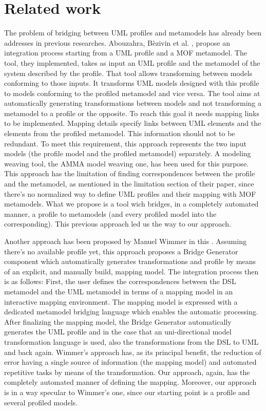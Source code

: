 \section{Related work}\label{sec:related}


The problem of bridging between UML profiles and metamodels has already been addresses in previous researches. Abouzahra, B\`ezivin et al. \cite{Abouzahra}, propose an integration process starting from a UML profile and a MOF metamodel. 
The tool, they implemented, takes as input an UML profile and the metamodel of the system described by the profile. That tool allows
transforming between models conforming to those inputs. It transforms UML models designed with this profile to models conforming to the profiled metamodel and vice versa. The tool aims at automatically generating transformations between models and not transforming a metamodel to a profile or the opposite. To reach this goal it needs mapping links to be implemented. Mapping details specify links between UML elements and the elements from the profiled metamodel. This information should not to be redundant. To meet this requirement, this approach represents the two input models (the profile model and the profiled metamodel) separately. A modeling weaving tool, the AMMA model weaving one, has been used for this purpose. This approach has the limitation of finding correspondences between the profile and the metamodel, as mentioned in the limitation section of their paper, since there's no normalized way to define UML profiles and their mapping with MOF metamodels. What we propose is a tool wich bridges, in a completely automated manner, a profile to metamodels (and every profiled model into the corresponding). This previous approach led us the way to our approach.

Another approach has been proposed by Manuel Wimmer in this \cite{Wimmer}. Assuming there's no available profile yet, this approach proposes a Bridge Generator component which automatically generates transformations and profile by means of an explicit, and manually build, mapping model. The integration process then is as follows: First, the user defines the correspondences between the DSL metamodel and the UML metamodel in terms of a mapping model in an interactive mapping environment. The mapping model is expressed with a dedicated metamodel bridging language which enables the automatic processing. After finalizing the mapping model, the Bridge Generator automatically generates the UML profile and in the case that an uni-directional model transformation language is used, also the transformations from the DSL to UML and back again. Wimmer's approach has, as its principal benefit, the reduction of error having a single source of information (the mapping model) and automated repetitive tasks by means of the transformation. Our approach, again, has the completely automated manner of defining the mapping. Moreover, our approach is in a way specular to Wimmer's one, since our starting point is a profile and several profiled models.


